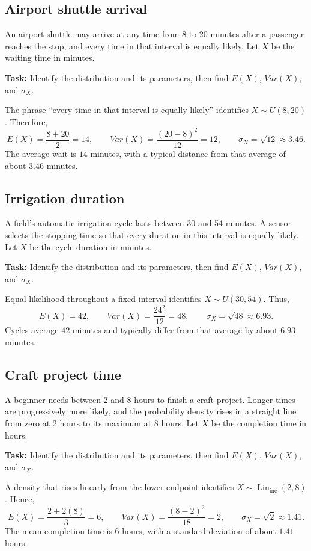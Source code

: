 \subsection{Airport shuttle arrival}\label{sec:c4-context-shuttle}
An airport shuttle may arrive at any time from 8 to 20 minutes after a
passenger reaches the stop, and every time in that interval is equally likely.
Let $X$ be the waiting time in minutes.

\textbf{Task:} Identify the distribution and its parameters, then find
$E(X)$, $Var(X)$, and $\sigma_X$.

The phrase ``every time in that interval is equally likely'' identifies
$X\sim U(8,20)$. Therefore,
\[
E(X)=\frac{8+20}{2}=14,\qquad
Var(X)=\frac{(20-8)^2}{12}=12,\qquad
\sigma_X=\sqrt{12}\approx3.46.
\]
The average wait is $14$ minutes, with a typical distance from that average of
about $3.46$ minutes.

\subsection{Irrigation duration}\label{sec:c4-context-irrigation}
A field's automatic irrigation cycle lasts between 30 and 54 minutes. A sensor
selects the stopping time so that every duration in this interval is equally
likely. Let $X$ be the cycle duration in minutes.

\textbf{Task:} Identify the distribution and its parameters, then find
$E(X)$, $Var(X)$, and $\sigma_X$.

Equal likelihood throughout a fixed interval identifies $X\sim U(30,54)$.
Thus,
\[
E(X)=42,\qquad Var(X)=\frac{24^2}{12}=48,\qquad
\sigma_X=\sqrt{48}\approx6.93.
\]
Cycles average $42$ minutes and typically differ from that average by about
$6.93$ minutes.

\subsection{Craft project time}\label{sec:c4-context-craft}
A beginner needs between 2 and 8 hours to finish a craft project. Longer times
are progressively more likely, and the probability density rises in a straight
line from zero at 2 hours to its maximum at 8 hours. Let $X$ be the completion
time in hours.

\textbf{Task:} Identify the distribution and its parameters, then find
$E(X)$, $Var(X)$, and $\sigma_X$.

A density that rises linearly from the lower endpoint identifies
$X\sim\operatorname{Lin}_{\mathrm{inc}}(2,8)$. Hence,
\[
E(X)=\frac{2+2(8)}{3}=6,\qquad
Var(X)=\frac{(8-2)^2}{18}=2,\qquad
\sigma_X=\sqrt2\approx1.41.
\]
The mean completion time is $6$ hours, with a standard deviation of about
$1.41$ hours.

